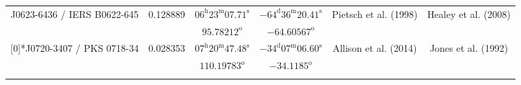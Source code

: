 \begin{landscape}
\begin{longtable}{cccccc}
 \multirow{2}[0]{*}{J0623-6436 / IERS B0622-645} & \multirow{2}[0]{*}{0.128889} &   $ 06^\text{h}23^\text{m}07.71^\text{s}$  & $ -64^\text{d}36^\text{m}20.41^\text{s} $  & 
    \multirow{2}[0]{*}{Pietsch et al. (1998) \cite{RedRef22_1998}} & \multirow{2}[0]{*}{Healey et al. (2008) \cite{CoordRef22_2008}} \\*
    & & $ 95.78212 ^\text{o}$ & $ -64.60567 ^\text{o}$ & & \\ \addlinespace 
 \multirow{2}[0]{*}{J0720-3407 / PKS 0718-34} & \multirow{2}[0]{*}{0.028353} &  
    $ 07^\text{h}20^\text{m}47.48^\text{s}$  & $ -34^\text{d}07^\text{m}06.60^\text{s} $  & 
    \multirow{2}[0]{*}{Allison et al. (2014) \cite{RedRef23_2014}} & \multirow{2}[0]{*}{Jones et al. (1992) \cite{CoordRef23_1992}} \\*
     & & $ 110.19783 ^\text{o}$ & $ -34.1185 ^\text{o}$ & & \\ \addlinespace 


\end{longtable}
\end{landscape}
